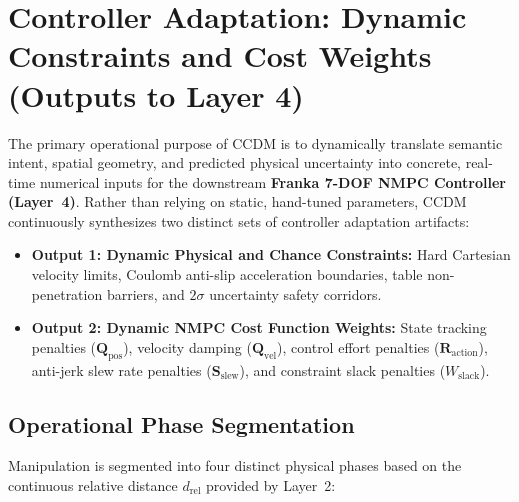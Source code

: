 \documentclass[10pt,a4paper]{article}
\begin{document}
\section{Controller Adaptation: Dynamic Constraints and Cost Weights (Outputs to Layer 4)}
The primary operational purpose of CCDM is to dynamically translate semantic intent, spatial geometry, and predicted physical uncertainty into concrete, real-time numerical inputs for the downstream \textbf{Franka 7-DOF NMPC Controller (Layer~4)}. Rather than relying on static, hand-tuned parameters, CCDM continuously synthesizes two distinct sets of controller adaptation artifacts:
\begin{itemize}
    \item \textbf{Output 1: Dynamic Physical and Chance Constraints:} Hard Cartesian velocity limits, Coulomb anti-slip acceleration boundaries, table non-penetration barriers, and $2\sigma$ uncertainty safety corridors.
    \item \textbf{Output 2: Dynamic NMPC Cost Function Weights:} State tracking penalties ($\mathbf{Q}_{\mathrm{pos}}$), velocity damping ($\mathbf{Q}_{\mathrm{vel}}$), control effort penalties ($\mathbf{R}_{\mathrm{action}}$), anti-jerk slew rate penalties ($\mathbf{S}_{\mathrm{slew}}$), and constraint slack penalties ($W_{\mathrm{slack}}$).
\end{itemize}

\subsection{Operational Phase Segmentation}
Manipulation is segmented into four distinct physical phases based on the continuous relative distance $d_{\mathrm{rel}}$ provided by Layer~2:
\end{document}
